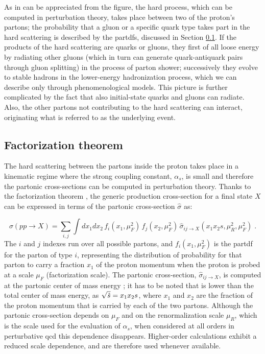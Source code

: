 As in can be appreciated from the figure, the hard process, which can be computed in perturbation theory, takes place between two of the proton's partons; the probability that a gluon or a specific quark type takes part in the hard scattering is described by the \glspl{partdf}, discussed in Section \ref{sec:ppint:hardscatter}. If the products of the hard scattering are quarks or gluons, they first of all loose energy by radiating other gluons (which in turn can generate quark-antiquark pairs through gluon splitting) in the process of parton shower;
successively they evolve to stable hadrons in the lower-energy hadronization process, which we can describe only through phenomenological models.
This picture is further complicated by the fact that also initial-state quarks and gluons can radiate. Also, the other partons not contributing to the hard scattering can interact, originating what is referred to as the underlying event. 

\subsection{Factorization theorem}
\label{sec:ppint:hardscatter}

The hard scattering between the partons inside the proton takes place in a kinematic regime where the strong coupling constant, $\alpha_s$, 
is small and therefore the partonic cross-sections can be computed in perturbation theory. 
Thanks to the factorization theorem \cite{doi:10.1146}, the generic production cross-section for a final state $X$ can be expressed in terms of the partonic cross-section $\hat\sigma$ as:

\begin{equation}
  \sigma(pp\rightarrow X) = \sum_{i,j} \int dx_1 dx_2\, 
     f_{i}(x_1,\mu_F^2)\, f_{j}(x_2,\mu_F^2)\, 
     \hat\sigma_{ij\rightarrow X}(x_1 x_2 s, \mu_R^2, \mu_F^2) \; .
  \label{eq:general-cross-section}
\end{equation}
The $i$ and $j$ indexes run over all possible partons, and $f_{i}(x_1,\mu_F^2)$ is the \gls{partdf} for the parton of type $i$, representing 
the distribution of probability for that parton to carry a fraction $x_1$ of the proton momentum when the proton is probed at a scale $\mu_F$
(factorization scale). The partonic cross-section, $\hat\sigma_{ij\rightarrow X}$, is computed at the partonic center of mass energy \cmpart;   
it has to be noted that \cmpart is lower than the total center of mass energy, as 
$\sqrt{\hat{s}} = x_1  x_2  s$, 
where $x_1$ and $x_2$ are the fraction of the proton momentum that is carried by each of the two partons.
Although the partonic cross-section depends on $\mu_F$ and on the renormalization scale $\mu_R$, 
which is the scale used for the evaluation of $\alpha_s$, 
when considered at all orders in perturbative \gls{qcd} this dependence disappears.
Higher-order calculations exhibit a reduced scale dependence, and are therefore used whenever available. 


